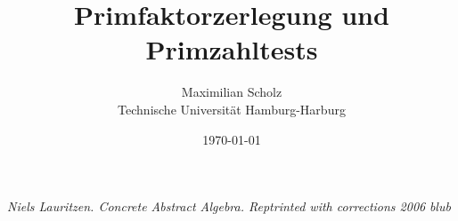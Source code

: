 \documentclass[12pt, a4paper, titlepage,twoside]{article}
\title{Primfaktorzerlegung und Primzahltests}
\author{Maximilian Scholz  \\
	Technische Universit\"at Hamburg-Harburg \\
}
\date{\today}
\begin{document}
	\maketitle
	
	\tableofcontents %
	\newpage	
	
	
		
	\newpage
	
	
	
	\newpage
	\begin{thebibliography}{2}
		 \emph{Niels Lauritzen. Concrete Abstract Algebra. Reptrinted with
			corrections 2006}
		 \emph{blub}
	\end{thebibliography}
	
\end{document}
